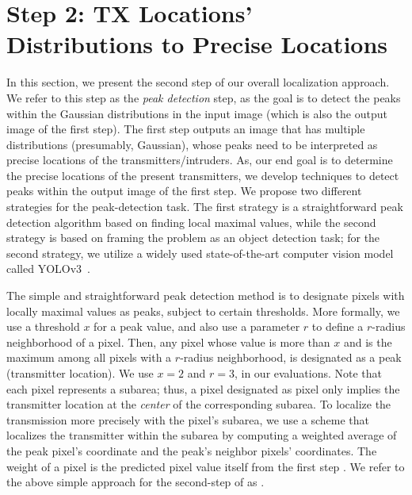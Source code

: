 \section{\our Step 2: TX Locations' Distributions to Precise Locations}
\label{sec:detect}

In this section, we present the second step of our overall localization approach. We refer to
this step as the {\em peak detection} step, as the goal is to detect the peaks within the 
Gaussian distributions in the input image (which is also the output image of the first step).
The first step outputs an image that has multiple distributions (presumably, Gaussian), whose
peaks need to be interpreted as precise locations of the transmitters/intruders.
As, our end goal is to determine the precise locations of the present transmitters, we develop techniques to detect peaks within  the output image of the first step. 
We propose two different strategies for the peak-detection task. The first strategy is a straightforward peak detection algorithm based on finding local maximal values, while the 
second strategy is based on framing the problem as an object detection task; for the second strategy, we utilize a widely used state-of-the-art computer vision model called YOLOv3~\cite{yolov3}.

The simple and straightforward peak detection method is to designate pixels with
locally maximal values as peaks, subject to certain thresholds.
More formally, we use a threshold $x$ for a peak value, and also use a parameter $r$ to define a $r$-radius neighborhood of a pixel. 
Then, any pixel whose value is more than $x$ and is the maximum among all pixels with a $r$-radius neighborhood, is designated as a peak (transmitter location). 
We use $x=2$ and $r=3$, in our evaluations.
Note that each pixel represents a subarea; thus, a pixel designated as pixel only 
implies the transmitter location at the {\em center} of the corresponding subarea.
To localize the transmission more precisely with the pixel's subarea, we use a scheme that localizes the transmitter within the subarea by computing a weighted average of the peak pixel's coordinate and the peak's neighbor pixels' coordinates.
The weight of a pixel is the predicted pixel value itself from the first step \imgimg.
We refer to the above simple approach for the second-step of \our as \simpeak.

